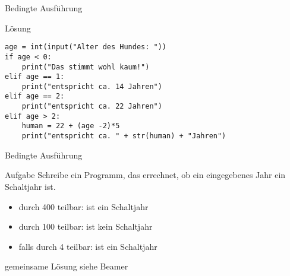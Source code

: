 \begin{frame}[fragile]{Bedingte Ausführung}
    \begin{exampleblock}{Lösung}
        \begin{lstlisting}
age = int(input("Alter des Hundes: "))
if age < 0:
    print("Das stimmt wohl kaum!")
elif age == 1:
    print("entspricht ca. 14 Jahren")
elif age == 2:
    print("entspricht ca. 22 Jahren")
elif age > 2:
    human = 22 + (age -2)*5
    print("entspricht ca. " + str(human) + "Jahren")
        \end{lstlisting}
    \end{exampleblock}
\end{frame}


\begin{frame}{Bedingte Ausführung}
    \begin{block}{Aufgabe}
        Schreibe ein Programm, das errechnet, ob ein eingegebenes Jahr ein
        Schaltjahr ist.
        \begin{itemize}
            \item durch 400 teilbar: ist ein Schaltjahr
            \item durch 100 teilbar: ist kein Schaltjahr
            \item falls durch 4 teilbar: ist ein Schaltjahr
        \end{itemize}
    \end{block}
    \pause{}
    \begin{exampleblock}{gemeinsame Lösung}
    siehe Beamer
    \end{exampleblock}
\end{frame}


